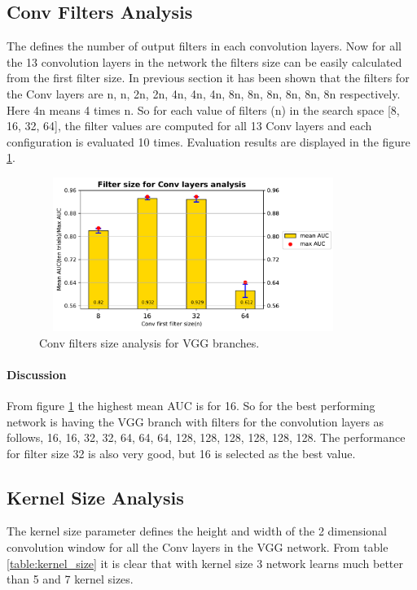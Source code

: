\subsection{Conv Filters Analysis}
The  \cite{kerasconv} defines the number of output filters in each convolution layers. Now for all the 13 convolution layers in the network the filters size can be easily calculated from the first filter size. In previous section
it has been shown that the filters for the Conv layers are n, n, 2n, 2n, 4n, 4n, 4n, 8n, 8n, 8n, 8n, 8n, 8n respectively. Here 4n means 4 times n. So for each value of filters (n) in the search space [8, 16, 32, 64], the filter values
are computed for all 13 Conv layers and each configuration is evaluated 10 times. Evaluation results are displayed in the figure \ref{fig:contrastive_loss_con2d_filter_bar}.

\begin{figure}[ht]
\centering
\includegraphics[width=10cm,height=5cm]{images/contrastive/contrastive_loss_con2d_filter_bar}
\caption{Conv filters size analysis for VGG branches.}
\label{fig:contrastive_loss_con2d_filter_bar}
\end{figure}

\paragraph{Discussion\\}
From figure \ref{fig:contrastive_loss_con2d_filter_bar} the highest mean AUC is for 16. So for the best performing network is having the VGG branch with filters for the convolution layers as follows, 
16, 16, 32, 32, 64, 64, 64, 128, 128, 128, 128, 128, 128. The performance for filter size 32 is also very good, but 16 is selected as the best value.

\subsection{Kernel Size Analysis}
The kernel size parameter defines the height and width of the 2 dimensional convolution window for all the Conv layers in the VGG network. From table \ref{table:kernel_size} it is clear that with kernel size 3 
network learns much better than 5 and 7 kernel sizes. 

